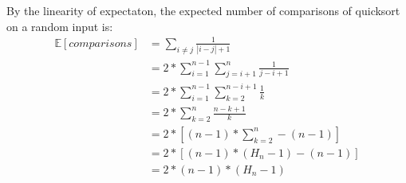 By the linearity of expectaton, the expected number of comparisons of quicksort on a random input is:\\
\begin{align}
	\mathbb{E}[comparisons] &= \sum_{i \neq j} \frac{1}{|i - j| + 1}\\
							&= 2 * \sum_{i = 1}^{n - 1} \sum_{j = i + 1}^{n} \frac{1}{j - i + 1}\\
							&= 2 * \sum_{i = 1}^{n - 1} \sum_{k = 2}^{n - i + 1} \frac{1}{k}\\
							&= 2 * \sum_{k = 2}^{n} \frac{n - k + 1}{k}\\
							&= 2 * [(n - 1) * \sum_{k = 2}^{n} - (n - 1)]\\
							&= 2 * [(n - 1) * (H_n - 1) - (n - 1)]\\
							&= 2 * (n - 1) * (H_n - 1)
\end{align}